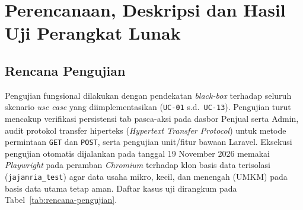 \clearpage
\section{Perencanaan, Deskripsi dan Hasil Uji Perangkat Lunak}

\subsection{Rencana Pengujian}

Pengujian fungsional dilakukan dengan pendekatan \textit{black-box} terhadap seluruh skenario \textit{use case} yang diimplementasikan (\texttt{UC-01} s.d.\ \texttt{UC-13}). Pengujian turut mencakup verifikasi persistensi tab pasca-aksi pada dasbor Penjual serta Admin, audit protokol transfer hiperteks (\textit{Hypertext Transfer Protocol}) untuk metode permintaan \texttt{GET} dan \texttt{POST}, serta pengujian unit/fitur bawaan Laravel. Eksekusi pengujian otomatis dijalankan pada tanggal 19 November 2026 memakai \textit{Playwright} pada peramban \textit{Chromium} terhadap klon basis data terisolasi (\texttt{jajanria\_test}) agar data usaha mikro, kecil, dan menengah (UMKM) pada basis data utama tetap aman. Daftar kasus uji dirangkum pada Tabel~\ref{tab:rencana-pengujian}.

